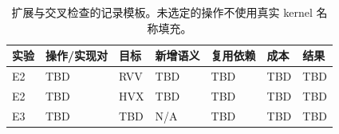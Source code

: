 \begin{table}[htbp]
\centering
\small
\caption{扩展与交叉检查的记录模板。未选定的操作不使用真实 kernel 名称填充。}
\label{tab:extension}
\begin{tabular}{@{}lllllll@{}}
\toprule
实验 & 操作/实现对 & 目标 & 新增语义 & 复用依赖 & 成本 & 结果 \\
\midrule
E2 & TBD & RVV & TBD & TBD & TBD & TBD \\
E2 & TBD & HVX & TBD & TBD & TBD & TBD \\
E3 & TBD & TBD & N/A & TBD & TBD & TBD \\
\bottomrule
\end{tabular}
\end{table}
